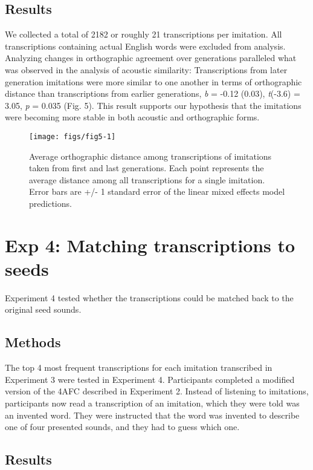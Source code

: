 \documentclass[10pt,letterpaper]{article}
\begin{document}
\subsection{Results}\label{results-2}

We collected a total of 2182 or roughly 21 transcriptions per imitation.
All transcriptions containing actual English words were excluded from
analysis. Analyzing changes in orthographic agreement over generations
paralleled what was observed in the analysis of acoustic similarity:
Transcriptions from later generation imitations were more similar to one
another in terms of orthographic distance than transcriptions from
earlier generations, \emph{b} = -0.12 (0.03), \emph{t}(-3.6) = 3.05,
\emph{p} = 0.035 (Fig. 5). This result supports our hypothesis that the
imitations were becoming more stable in both acoustic and orthographic
forms.

\begin{figure}
\texttt{[image: figs/fig5-1]} \caption{Average orthographic distance among transcriptions of imitations taken from first and last generations. Each point represents the average distance among all transcriptions for a single imitation. Error bars are +/- 1 standard error of the linear mixed effects model predictions.}\label{fig:fig5}
\end{figure}

\section{Exp 4: Matching transcriptions to
seeds}\label{exp-4-matching-transcriptions-to-seeds}

Experiment 4 tested whether the transcriptions could be matched back to
the original seed sounds.

\subsection{Methods}\label{methods-3}

The top 4 most frequent transcriptions for each imitation transcribed in
Experiment 3 were tested in Experiment 4. Participants completed a
modified version of the 4AFC described in Experiment 2. Instead of
listening to imitations, participants now read a transcription of an
imitation, which they were told was an invented word. They were
instructed that the word was invented to describe one of four presented
sounds, and they had to guess which one.

\subsection{Results}\label{results-3}
\end{document}
